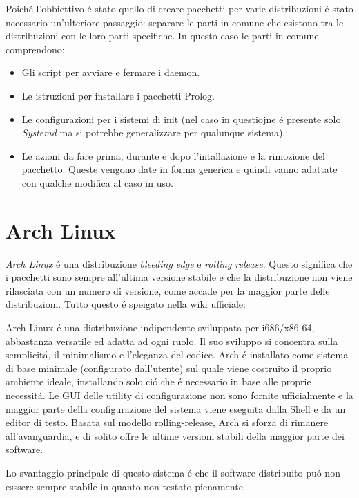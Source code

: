 \documentclass[10pt,titlepage,twoside,a4paper]{report}
\begin{document}
Poich\'e l'obbiettivo \'e stato quello di creare pacchetti per varie 
distribuzioni \'e stato necessario un'ulteriore passaggio: separare le parti in 
comune che esistono tra le distribuzioni con le loro parti specifiche. In 
questo caso le parti in comune comprendono:
\begin{itemize}
    \item Gli script per avviare e fermare i daemon.
    \item Le istruzioni per installare i pacchetti Prolog.
    \item Le configurazioni per i sistemi di init (nel caso in questiojne \'e 
presente solo \emph{Systemd} ma si potrebbe generalizzare per qualunque 
sistema).
    \item Le azioni da fare prima, durante e dopo l'intallazione e la rimozione 
del pacchetto. Queste vengono date in forma generica e quindi vanno adattate 
con qualche modifica al caso in uso.
\end{itemize}

\section{Arch Linux}
\emph{Arch Linux} \'e una distribuzione \emph{bleeding edge} e \emph{rolling 
release}. Questo significa che i pacchetti sono sempre all'ultima versione 
stabile e che la distribuzione non viene rilasciata con un numero di versione, 
come accade per la maggior parte delle distribuzioni. Tutto questo \'e speigato 
nella wiki ufficiale\cite{archLinux}:
\begin{displayquote}
Arch Linux \'e una distribuzione indipendente sviluppata per i686/x86-64, 
abbastanza versatile ed adatta ad ogni ruolo. Il suo sviluppo si concentra 
sulla semplicit\'a, il minimalismo e l'eleganza del codice. Arch \'e installato 
come sistema di base minimale (configurato dall'utente) sul quale viene 
costruito il proprio ambiente ideale, installando solo ci\'o che \'e necessario 
in base alle proprie necessit\'a. Le GUI delle utility di configurazione non 
sono fornite ufficialmente e la maggior parte della configurazione del sistema viene 
eseguita dalla Shell e da un editor di testo. Basata sul modello 
rolling-release, Arch si sforza di rimanere all'avanguardia, e di solito offre 
le ultime versioni stabili della maggior parte dei software.
\end{displayquote}
Lo svantaggio principale di questo sistema \'e che il software distribuito 
pu\'o non esssere sempre stabile in quanto non testato pienamente
\end{document}

